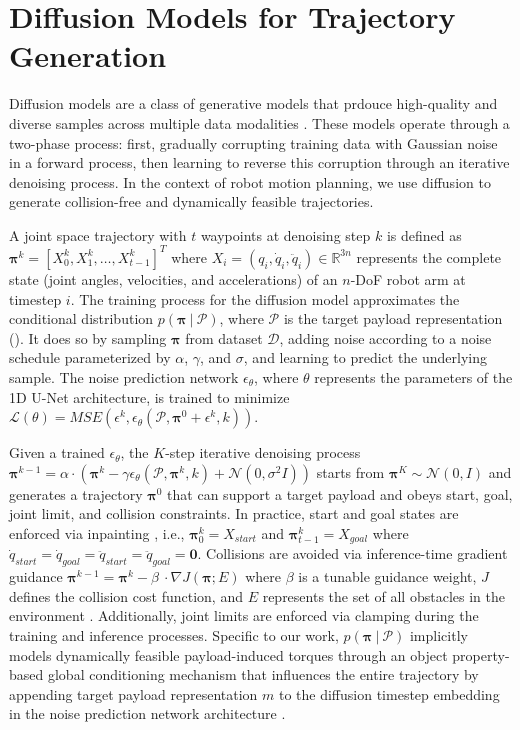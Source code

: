 \section{Diffusion Models for Trajectory Generation}\label{sec:diffusion}

Diffusion models are a class of generative models that prdouce high-quality and diverse samples across multiple data modalities \cite{ho2020denoising}. 
These models operate through a two-phase process: first, gradually corrupting training data with Gaussian noise in a forward process, then learning to reverse this corruption through an iterative denoising process.
In the context of robot motion planning, we use diffusion to generate collision-free and dynamically feasible trajectories.

A joint space trajectory with $t$ waypoints at denoising step $k$ is defined as
$\bm{\pi}^k = [ X_0^k, X_1^k, \dots, X_{t-1}^k ]^T$
where $X_i = (q_i, \dot{q}_i, \ddot{q}_i) \in \mathbb{R}^{3n}$ represents the complete state (joint angles, velocities, and accelerations) of an $n$-DoF robot arm at timestep $i$.
The training process for the diffusion model approximates the conditional distribution $p(\bm{\pi}\ |\ \mathcal{P})$, where $\mathcal{P}$ is the target payload representation ().
It does so by sampling $\bm{\pi}$ from dataset $\mathcal{D}$, adding noise according to a noise schedule parameterized by $\alpha$, $\gamma$, and $\sigma$, and learning to predict the underlying sample. The noise prediction network $\epsilon_\theta$, where $\theta$ represents the parameters of the 1D U-Net architecture, is trained to minimize
    $\mathcal{L}(\theta) = MSE(\epsilon^k, \epsilon_\theta(\mathcal{P}, \bm{\pi}^0 + \epsilon^k, k))$.

Given a trained $\epsilon_\theta$, the $K$-step iterative denoising process
    $\bm{\pi}^{k-1} = \alpha \cdot (\bm{\pi}^k - \gamma\epsilon_\theta(\mathcal{P}, \bm{\pi}^k, k) + \mathcal{N}(0, \sigma^2I))$
starts from $\bm{\pi}^K \sim \mathcal{N}(0, I)$ and generates a trajectory $\bm{\pi}^0$ that can support a target payload and obeys start, goal, joint limit, and collision constraints.
In practice, start and goal states are enforced via inpainting \cite{carvalho2023motion}, i.e., $\bm{\pi}_0^k = X_{start}$ and $\bm{\pi}_{t-1}^k = X_{goal}$ where $\dot{q}_{start} = \dot{q}_{goal} = \ddot{q}_{start} = \ddot{q}_{goal} = \bm{0}$.
Collisions are avoided via inference-time gradient guidance $\bm{\pi}^{k-1} = \bm{\pi}^k - \beta\ \cdot \nabla J(\bm{\pi}; E)$ where $\beta$ is a tunable guidance weight, $J$ defines the collision cost function, and $E$ represents the set of all obstacles in the environment \cite{saha2024edmp}.
Additionally, joint limits are enforced via clamping during the training and inference processes.
Specific to our work, $p(\bm{\pi}\ |\ \mathcal{P})$ implicitly models dynamically feasible payload-induced torques through an object property-based global conditioning mechanism that influences the entire trajectory by appending target payload representation $m$ to the diffusion timestep embedding in the noise prediction network architecture \cite{chi2023diffusionpolicy}.